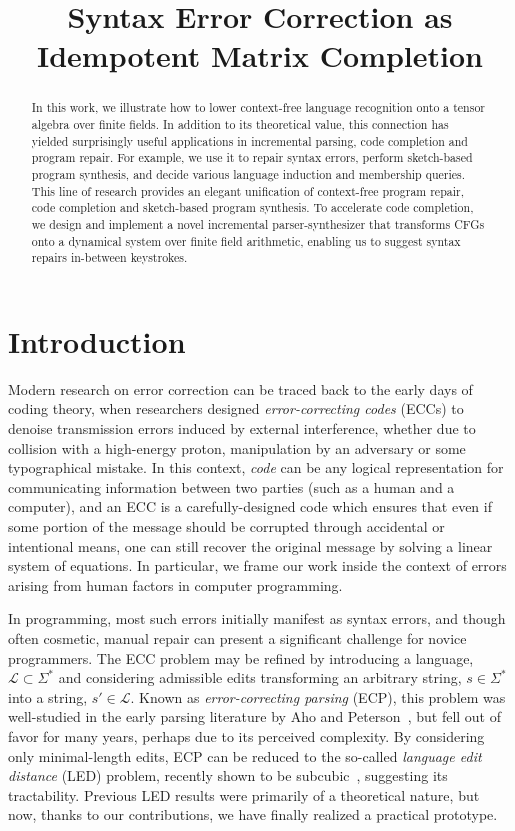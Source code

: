 \documentclass[sigplan,review,anonymous,acmsmall]{acmart}\settopmatter{printfolios=false,printccs=false,printacmref=false}
\begin{document}
\title{Syntax Error Correction as Idempotent Matrix Completion}
\begin{abstract}
In this work, we illustrate how to lower context-free language recognition onto a tensor algebra over finite fields. In addition to its theoretical value, this connection has yielded surprisingly useful applications in incremental parsing, code completion and program repair. For example, we use it to repair syntax errors, perform sketch-based program synthesis, and decide various language induction and membership queries. This line of research provides an elegant unification of context-free program repair, code completion and sketch-based program synthesis. To accelerate code completion, we design and implement a novel incremental parser-synthesizer that transforms CFGs onto a dynamical system over finite field arithmetic, enabling us to suggest syntax repairs in-between keystrokes.
\end{abstract}

\maketitle

\section{Introduction}

Modern research on error correction can be traced back to the early days of coding theory, when researchers designed \textit{error-correcting codes} (ECCs) to denoise transmission errors induced by external interference, whether due to collision with a high-energy proton, manipulation by an adversary or some typographical mistake. In this context, \textit{code} can be any logical representation for communicating information between two parties (such as a human and a computer), and an ECC is a carefully-designed code which ensures that even if some portion of the message should be corrupted through accidental or intentional means, one can still recover the original message by solving a linear system of equations. In particular, we frame our work inside the context of errors arising from human factors in computer programming.

In programming, most such errors initially manifest as syntax errors, and though often cosmetic, manual repair can present a significant challenge for novice programmers. The ECC problem may be refined by introducing a language, $\mathcal{L} \subset \Sigma^*$ and considering admissible edits transforming an arbitrary string, $s \in \Sigma^*$ into a string, $s'\in\mathcal{L}$. Known as \textit{error-correcting parsing} (ECP), this problem was well-studied in the early parsing literature by Aho and Peterson~\cite{aho1972minimum}, but fell out of favor for many years, perhaps due to its perceived complexity. By considering only minimal-length edits, ECP can be reduced to the so-called \textit{language edit distance} (LED) problem, recently shown to be subcubic~\cite{bringmann2019truly}, suggesting its tractability. Previous LED results were primarily of a theoretical nature, but now, thanks to our contributions, we have finally realized a practical prototype.
\end{document}
